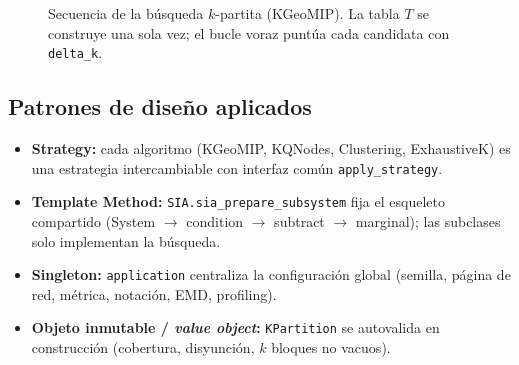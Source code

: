 \documentclass[11pt,letterpaper]{article}
\begin{document}
\begin{figure}[H]
	\centering
	\caption{Secuencia de la búsqueda $k$-partita (KGeoMIP). La tabla $T$ se construye
		una sola vez; el bucle voraz puntúa cada candidata con \texttt{delta\_k}.}
	\label{fig:seq}
\end{figure}

\subsection{Patrones de diseño aplicados}
\begin{itemize}
	\item \textbf{Strategy:} cada algoritmo (KGeoMIP, KQNodes, Clustering,
	      ExhaustiveK) es una estrategia intercambiable con interfaz común
	      \texttt{apply\_strategy}.
	\item \textbf{Template Method:} \texttt{SIA.sia\_prepare\_subsystem} fija el
	      esqueleto compartido (System $\to$ condition $\to$ subtract $\to$ marginal); las
	      subclases solo implementan la búsqueda.
	\item \textbf{Singleton:} \texttt{application} centraliza la configuración global
	      (semilla, página de red, métrica, notación, EMD, profiling).
	\item \textbf{Objeto inmutable / \emph{value object}:} \texttt{KPartition} se
	      autovalida en construcción (cobertura, disyunción, $k$ bloques no vacuos).
\end{itemize}
\end{document}
